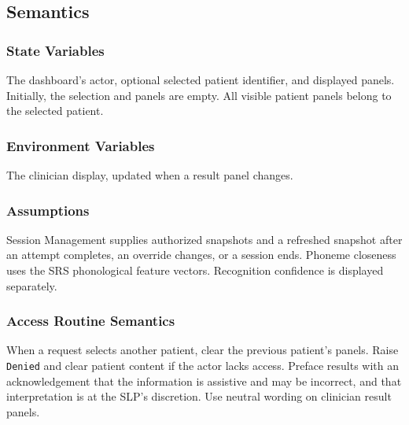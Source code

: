 \documentclass[12pt, titlepage]{article}
\begin{document}
\subsection{Semantics}

\subsubsection{State Variables}
The dashboard's actor, optional selected patient identifier, and displayed
panels. Initially, the selection and panels are empty. All visible patient
panels belong to the selected patient.

\subsubsection{Environment Variables}
The clinician display, updated when a result panel changes.

\subsubsection{Assumptions}
Session Management supplies authorized snapshots and a refreshed snapshot
after an attempt completes, an override changes, or a session ends.
Phoneme closeness uses the SRS phonological feature vectors. Recognition
confidence is displayed separately.

\subsubsection{Access Routine Semantics}
When a request selects another patient, clear the previous patient's panels.
Raise \texttt{Denied} and clear patient content if the actor lacks access.
Preface results with an acknowledgement that the information is assistive
and may be incorrect, and that interpretation is at the SLP's discretion.
Use neutral wording on clinician result panels.
\end{document}
